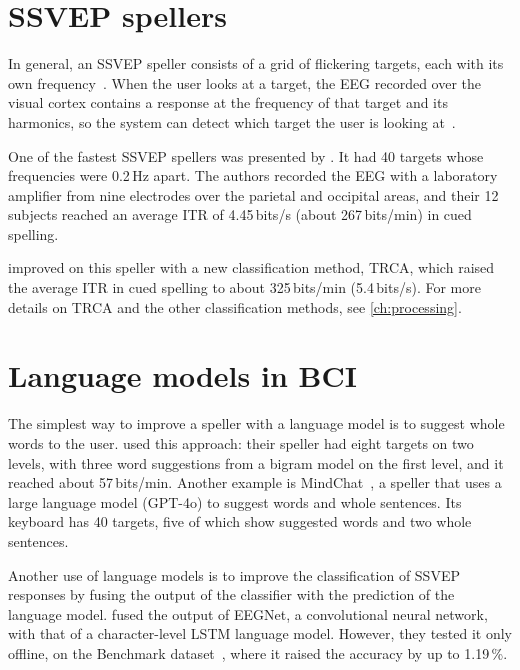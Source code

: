 \section{SSVEP spellers}
\label{sec:spellers}

In general, an \ac{SSVEP} speller consists of a grid of flickering targets, each with its
own frequency~\citep{nakanishi2018trca}. When the user looks at a target, the \ac{EEG}
recorded over the visual cortex contains a response at the frequency of that target and
its harmonics, so the system can detect which target the user is looking
at~\citep{chen2015fbcca}.

One of the fastest \ac{SSVEP} spellers was presented by \citet{chen2015highspeed}. It had
40 targets whose frequencies were 0.2\,Hz apart. The authors recorded the \ac{EEG} with a
laboratory amplifier from nine electrodes over the parietal and occipital areas, and their
12 subjects reached an average \ac{ITR} of 4.45\,bits/s (about 267\,bits/min) in cued
spelling.

\citet{nakanishi2018trca} improved on this speller with a new classification method,
\ac{TRCA}, which raised the average \ac{ITR} in cued spelling to about 325\,bits/min
(5.4\,bits/s). For more details on \ac{TRCA} and the other classification methods, see
\cref{ch:processing}.

\section{Language models in BCI}
\label{sec:lm-bci}

The simplest way to improve a speller with a language model is to suggest whole words to
the user. \citet{gembler2019dynamic} used this approach: their speller had eight targets on
two levels, with three word suggestions from a bigram model on the first level, and it
reached about 57\,bits/min. Another example is MindChat~\citep{wang2025mindchat}, a speller
that uses a large language model (GPT-4o) to suggest words and whole sentences. Its
keyboard has 40 targets, five of which show suggested words and two whole sentences.

Another use of language models is to improve the classification of \ac{SSVEP} responses by
fusing the output of the classifier with the prediction of the language model.
\citet{zhang2025improving} fused the output of EEGNet, a convolutional neural network, with
that of a character-level \ac{LSTM} language model. However, they tested it only offline,
on the Benchmark dataset~\citep{wang2017benchmark}, where it raised the accuracy by up to
1.19\,\%.

